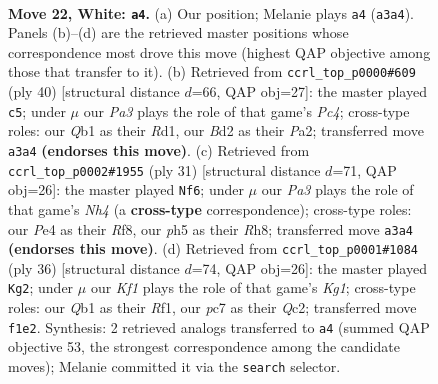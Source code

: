 \documentclass[11pt]{article}
\begin{document}
\clearpage

\begin{figure}[p]\centering
\begin{subfigure}{0.46\textwidth}\centering
\resizebox{\linewidth}{!}{%
\newchessgame
\chessboard[
  setfen={1r1q1b2/n1p1r2k/p2p1pp1/1p1Pp2p/1P2P3/P2PRN1P/3B1PP1/RQ3K2 w - - 0 22},
  showmover=false,
  pgfstyle=straightmove, color=movearrow, markmove={a3-a4}
]}
\caption{}
\end{subfigure}\hfill
\begin{subfigure}{0.46\textwidth}\centering
\resizebox{\linewidth}{!}{%
\newchessgame
\chessboard[
  setfen={r7/2pnqrpk/ppbp3p/5p2/1PPPp3/1NR1P2P/P1Q1BPP1/3R2K1 w - - 6 21},
  showmover=false,
  pgfstyle=straightmove, color=movearrow, markmove={c4-c5}
]}
\caption{}
\end{subfigure}
\\[4pt]
\begin{subfigure}{0.46\textwidth}\centering
\resizebox{\linewidth}{!}{%
\newchessgame
\chessboard[
  setfen={2k2r1r/pbp1q3/1pnpp2p/5ppn/2PP4/1NP1PP1P/P1Q2BP1/2KR1B1R b - - 0 16},
  showmover=false,
  pgfstyle=straightmove, color=movearrow, markmove={h5-f6}
]}
\caption{}
\end{subfigure}\hfill
\begin{subfigure}{0.46\textwidth}\centering
\resizebox{\linewidth}{!}{%
\newchessgame
\chessboard[
  setfen={r2r2k1/1p1nqpbp/2p3p1/p1p1p3/P3P3/2PPB1PP/1PQN1P2/4RRK1 w - - 5 19},
  showmover=false,
  pgfstyle=straightmove, color=movearrow, markmove={g1-g2}
]}
\caption{}
\end{subfigure}
\caption{\textbf{Move 22, White: \texttt{a4}.} (a) Our position; Melanie plays \texttt{a4} (\texttt{a3a4}). Panels (b)--(d) are the retrieved master positions whose correspondence most drove this move (highest QAP objective among those that transfer to it). (b) Retrieved from \texttt{ccrl\_top\_p0000\#609} (ply 40) [structural distance $d$=66, QAP obj=27]: the master played \texttt{c5}; under $\mu$ our \emph{Pa3} plays the role of that game's \emph{Pc4}; cross-type roles: our \emph{Q}b1 as their \emph{R}d1, our \emph{B}d2 as their \emph{P}a2; transferred move \texttt{a3a4} \textbf{(endorses this move)}. (c) Retrieved from \texttt{ccrl\_top\_p0002\#1955} (ply 31) [structural distance $d$=71, QAP obj=26]: the master played \texttt{Nf6}; under $\mu$ our \emph{Pa3} plays the role of that game's \emph{Nh4} (a \textbf{cross-type} correspondence); cross-type roles: our \emph{P}e4 as their \emph{R}f8, our \emph{p}h5 as their \emph{R}h8; transferred move \texttt{a3a4} \textbf{(endorses this move)}. (d) Retrieved from \texttt{ccrl\_top\_p0001\#1084} (ply 36) [structural distance $d$=74, QAP obj=26]: the master played \texttt{Kg2}; under $\mu$ our \emph{Kf1} plays the role of that game's \emph{Kg1}; cross-type roles: our \emph{Q}b1 as their \emph{R}f1, our \emph{p}c7 as their \emph{Q}c2; transferred move \texttt{f1e2}. Synthesis: 2 retrieved analogs transferred to \texttt{a4} (summed QAP objective 53, the strongest correspondence among the candidate moves); Melanie committed it via the \texttt{search} selector.}
\label{fig:thought-m42}
\end{figure}
\end{document}
